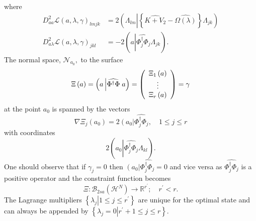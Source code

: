 \documentclass[aps,preprint]{revtex4}%
\begin{document}
where
\begin{align}
D_{aa}^{2}\mathcal{L}\left(  a,\lambda,\gamma\right)  _{lmjk}  &  =2\left(
\Lambda_{lm}\left\vert \left\{  \widehat{K+V_{2}}-\widehat{\Omega\left(
\lambda\right)  }\right\}  \right.  \Lambda_{jk}\right) \nonumber\\
D_{a\lambda}^{2}\mathcal{L}\left(  a,\lambda,\gamma\right)  _{jkl}  &
=-2\left(  a\left\vert \widehat{\Phi_{j}^{\dagger}\Phi_{j}}\right.
\Lambda_{jk}\right)  .
\end{align}
The normal space, $\mathcal{N}_{a_{0}},$ to the surface
\begin{equation}
\Xi\left(  a\right)  =\left(  a\left\vert \widehat{\Phi^{\dagger}\Phi}\right.
a\right)  =\left(
\begin{array}
[c]{c}%
\Xi_{1}\left(  a\right) \\
\vdots\\
\Xi_{r}\left(  a\right)
\end{array}
\right)  =\gamma
\end{equation}
at the point $a_{0}$ is spanned by the vectors
\begin{equation}
\nabla\Xi_{j}\left(  a_{0}\right)  =2\left(  \overset{}{a_{0}}\right\vert
\widehat{\Phi_{j}^{\dagger}\Phi_{j}},\quad1\leq j\leq r
\end{equation}
with coordinates
\begin{equation}
2\left(  a_{0}\left\vert \widehat{\Phi_{j}^{\dagger}\Phi_{j}}\right.
\Lambda_{kl}\right)  .
\end{equation}
One should observe that if $\gamma_{j}=0$ then $\left(  \overset{}{a_{0}%
}\right\vert \widehat{\Phi_{j}^{\dagger}\Phi_{j}}=0$ and vice versa as
$\widehat{\Phi_{j}^{\dagger}\Phi_{j}}$ is a positive operator and the
constraint function becomes
\begin{equation}
\Xi:\mathcal{B}_{2sa}\left(  \mathcal{H}^{N}\right)  \rightarrow
\mathbb{R}^{r^{\prime}};\quad r^{\prime}<r.
\end{equation}
The Lagrange multipliers $\left\{  \left.  \lambda_{j}\right\vert 1\leq j\leq
r^{\prime}\right\}  $ are unique for the optimal state and can always be
appended by $\left\{  \left.  \lambda_{j}=0\right\vert r^{\prime}+1\leq j\leq
r\right\}  .$
\end{document}
